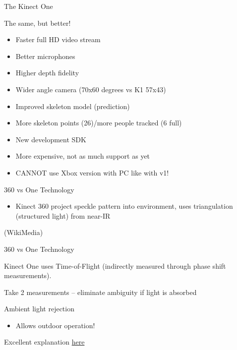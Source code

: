 \documentclass[compress]{beamer}
\begin{document}
\begin{frame}{The Kinect One}

    The same, but better!

    \begin{itemize}

        \item
              Faster full HD video stream
        \item
              Better microphones
        \item
              Higher depth fidelity
        \item
              Wider angle camera (70x60 degrees vs K1 57x43)
        \item
              Improved skeleton model (prediction)
        \item
              More skeleton points (26)/more people tracked (6 full)
        \item
              New development SDK
        \item
              More expensive, not as much support as yet
        \item
              CANNOT use Xbox version with PC like with v1!
    \end{itemize}

\end{frame}

\begin{frame}{360 vs One Technology}

    \begin{itemize}

        \item
              Kinect 360 project speckle pattern into environment, uses
              triangulation (structured light) from near-IR
    \end{itemize}

    (WikiMedia)

\end{frame}

\begin{frame}{360 vs One Technology}

    Kinect One uses Time-of-Flight (indirectly measured through phase shift
    measurements).

    Take 2 measurements -- eliminate ambiguity if light is absorbed

    Ambient light rejection

    \begin{itemize}

        \item
              Allows outdoor operation!
    \end{itemize}

    Excellent explanation
    \href{http://www.gamasutra.com/blogs/DanielLau/20131127/205820/The_Science_Behind_Kinects_or_Kinect_10_versus_20.php}{here}

\end{frame}
\end{document}
